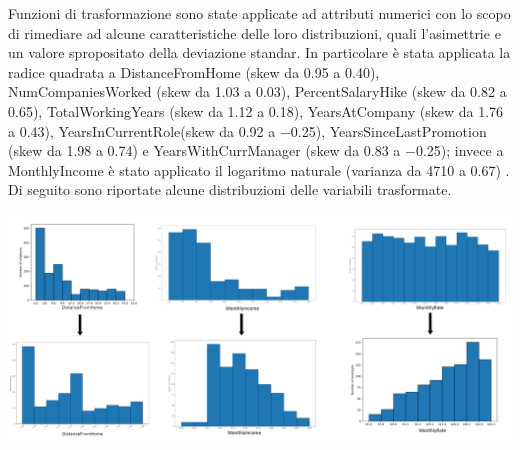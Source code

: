 \documentclass[a4paper,9pt]{article}
\begin{document}
Funzioni di trasformazione sono state applicate ad attributi numerici con lo scopo di rimediare ad alcune caratteristiche delle loro distribuzioni, quali l'asimettrie e un valore spropositato della deviazione standar. In particolare è stata applicata la radice quadrata a DistanceFromHome (skew da 0.95 a 0.40), NumCompaniesWorked (skew da 1.03 a 0.03), PercentSalaryHike (skew da 0.82 a 0.65), TotalWorkingYears (skew da 1.12 a 0.18), YearsAtCompany (skew da 1.76 a 0.43), YearsInCurrentRole(skew da 0.92 a $-$0.25), YearsSinceLastPromotion (skew da 1.98 a 0.74) e YearsWithCurrManager (skew da 0.83 a $-$0.25); invece a MonthlyIncome è stato applicato il logaritmo naturale (varianza da 4710 a 0.67) . Di seguito sono riportate alcune distribuzioni delle variabili trasformate.\\

\begin{center}
\includegraphics[scale=0.35]{trasformer.png}
\end{center}
\end{document}
